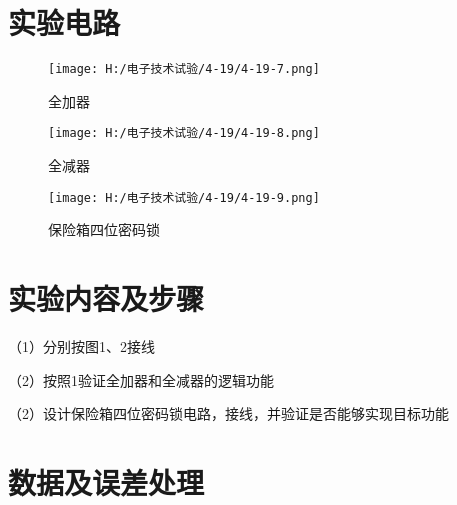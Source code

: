 \documentclass{article}
\begin{document}
\newpage
\section{ 实验电路}
\begin{figure}[h]
  \centering
  \texttt{[image: H:/电子技术试验/4-19/4-19-7.png]}
  \caption{全加器} \label{fig:aa}
\end{figure}
\begin{figure}[h]
  \centering
  \texttt{[image: H:/电子技术试验/4-19/4-19-8.png]}
  \caption{全减器} \label{fig:aa}
  \end{figure}
\begin{figure}[h]
  \centering
  \texttt{[image: H:/电子技术试验/4-19/4-19-9.png]}
  \caption{保险箱四位密码锁} \label{fig:aa}
  \end{figure}
  
\newpage
\section{ 实验内容及步骤}
（1）分别按图1、2接线\par
（2）按照1验证全加器和全减器的逻辑功能\par
（2）设计保险箱四位密码锁电路，接线，并验证是否能够实现目标功能      \par




\section{ 数据及误差处理}
\end{document}
